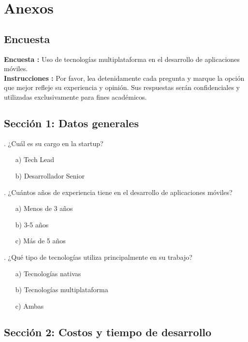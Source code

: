 \newpage
\section{Anexos}
\subsection{Encuesta}

\textbf{Encuesta : } Uso de tecnologías multiplataforma en el desarrollo de aplicaciones móviles.\\

\textbf{Instrucciones : }  Por favor, lea detenidamente cada pregunta y marque la opción que mejor
refleje su experiencia y opinión. Sus respuestas serán confidenciales y utilizadas exclusivamente para fines académicos.

\subsection*{Sección 1: Datos generales}

. ¿Cuál es su cargo en la startup?  
   \begin{itemize}
       \item[a)] Tech Lead  
       \item[b)] Desarrollador Senior  
   \end{itemize}

. ¿Cuántos años de experiencia tiene en el desarrollo de aplicaciones móviles?  
   \begin{itemize}
       \item[a)] Menos de 3 años  
       \item[b)] 3-5 años  
       \item[c)] Más de 5 años  
   \end{itemize}

. ¿Qué tipo de tecnologías utiliza principalmente en su trabajo?  
   \begin{itemize}
       \item[a)] Tecnologías nativas  
       \item[b)] Tecnologías multiplataforma  
       \item[c)] Ambas  
   \end{itemize}

\subsection*{Sección 2: Costos y tiempo de desarrollo}

